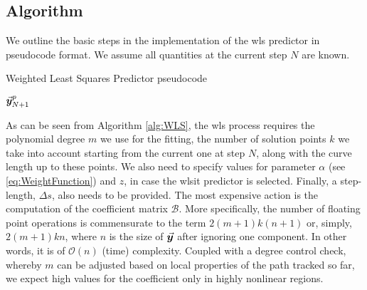 \subsection{Algorithm}\label{CH5-S3SS1}
We outline the basic steps in the implementation of the \acrshort{wls}
predictor in pseudocode format. We assume all quantities at the current step
$N$ are known.

\begin{algorithm}[t]
	\caption{Weighted Least Squares Predictor pseudocode}
	\label{alg:WLS}
	\begin{algorithmic}
		\ENDFOR
		\STATE{}
		\STATE{}
		\STATE{}
		\RETURN $\vec{\bm{y}}^p_{N+1}$
	\end{algorithmic}
\end{algorithm}

As can be seen from Algorithm \ref{alg:WLS}, the \acrshort{wls} process 
requires the 
polynomial degree  $m$ we use for the fitting, the number of solution 
points $k$ we take into account starting from the current one at step $N$, 
along with the curve length up to these points. We also need to specify values 
for
parameter $\alpha$ (see \ref{eq:WeightFunction}) and $z$, in case the 
\acrshort{wlsit}
predictor is selected. Finally, a step-length, $\Delta s$, also needs to be
provided. The most expensive action is the computation of the coefficient matrix
$\bm{\mathcal{B}}$. More specifically, the number of floating point operations 
is
commensurate to the term $2(m+1)k(n+1)$ or, simply, $2(m+1)kn$, where $n$ is
the size of $\vec{\bm{y}}$ after ignoring one component. In other words, it
is of $\mathcal{O}(n)$ (time) complexity. Coupled with a degree control check, 
whereby
$m$ can be adjusted based on local properties of the path tracked so far, we 
expect high values for the coefficient only in highly nonlinear regions. 

